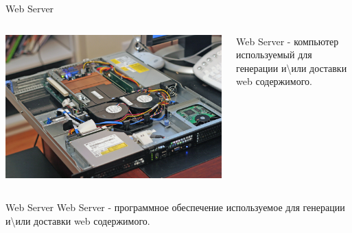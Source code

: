 \begin{frame}{Web Server}
    \begin{columns}[t] %
         \begin{column}[T]{5cm} %
            \begin{center}
              \includegraphics[width=\textwidth]{sources/images/Inside_and_Rear_of_Webserver.jpg}
            \end{center}
         \end{column}
         \begin{column}[T]{5cm} %
            \begin{center}
            Web Server - компьютер используемый для генерации и\textbackslash или доставки web содержимого.
            \end{center}
         \end{column}
     \end{columns}
\end{frame}

\begin{frame}{Web Server}
   Web Server - программное обеспечение используемое для генерации и\textbackslash или доставки web содержимого.
\end{frame}
